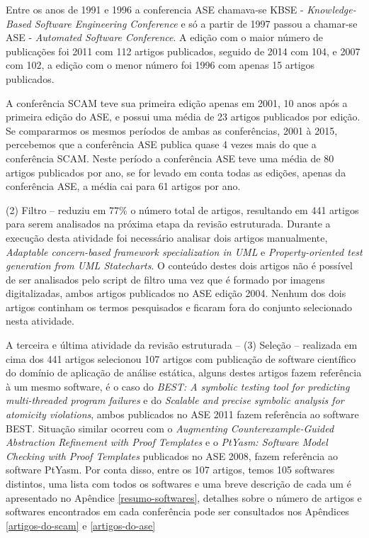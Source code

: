 Entre os anos de 1991 e 1996 a conferencia ASE chamava-se KBSE - {\it
Knowledge-Based Software Engineering Conference} e só a partir de 1997 passou a
chamar-se ASE - {\it Automated Software Conference}. A edição com o maior
número de publicações foi 2011 com 112 artigos publicados, seguido de 2014 com
104, e 2007 com 102, a edição com o menor número foi 1996 com apenas 15 artigos
publicados.

A conferência SCAM teve sua primeira edição apenas em 2001, 10 anos após a
primeira edição do ASE, e possui uma média de 23 artigos publicados por edição.
Se compararmos os mesmos períodos de ambas as conferências, 2001 à 2015,
percebemos que a conferência ASE publica quase 4 vezes mais do que a
conferência SCAM. Neste período a conferência ASE teve uma média de 80 artigos
publicados por ano, se for levado em conta todas as edições, apenas da
conferência ASE, a média cai para 61 artigos por ano.

(2) Filtro -- reduziu em 77\%
o número total de artigos, resultando em 441 artigos
para serem analisados na próxima etapa da revisão estruturada.  Durante a execução desta
atividade foi necessário analisar dois artigos manualmente, {\it Adaptable
concern-based framework specialization in UML} e {\it Property-oriented test
generation from UML Statecharts}. O conteúdo destes dois artigos não é possível
de ser analisados pelo script de filtro uma vez que é formado por imagens
digitalizadas, ambos artigos publicados no ASE edição 2004. Nenhum dos dois
artigos continham os termos pesquisados e ficaram fora do conjunto selecionado
nesta atividade.

A terceira e última atividade da revisão estruturada -- (3) Seleção --
realizada em cima dos 441 artigos selecionou 107 artigos com publicação de
software científico do domínio de aplicação de análise estática, alguns destes
artigos fazem referência à um mesmo software, é o caso do {\it BEST: A symbolic
testing tool for predicting multi-threaded program failures} e do {\it Scalable
and precise symbolic analysis for atomicity violations}, ambos publicados no
ASE 2011 fazem referência ao software BEST. Situação similar ocorreu com o {\it Augmenting
Counterexample-Guided Abstraction Refinement with Proof Templates} e o {\it
PtYasm: Software Model Checking with Proof Templates} publicados no ASE 2008,
fazem referência ao software PtYasm. Por conta disso, entre os 107 artigos, temos
105 softwares distintos, uma lista com todos os softwares e uma breve descrição
de cada um é apresentado no Apêndice \ref{resumo-softwares},
detalhes sobre o número de artigos e softwares encontrados em cada conferência
pode ser consultados nos Apêndices \ref{artigos-do-scam} e \ref{artigos-do-ase} 

